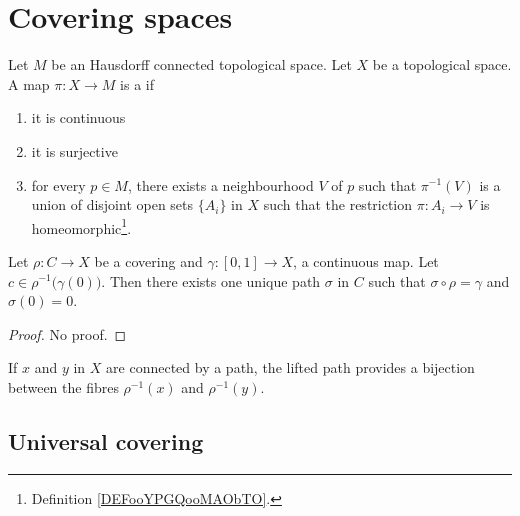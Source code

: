 \section{Covering spaces}

\begin{definition}      \label{DEFooQBDWooVVrkkh}
    Let \( M\) be an Hausdorff connected topological space. Let \( X\) be a topological space. A map \( \pi\colon X\to M\) is a  if
    \begin{enumerate}
        \item
            it is continuous
        \item
            it is surjective
        \item
            for every \( p\in M\), there exists a neighbourhood \( V\) of \( p\) such that \( \pi^{-1}(V)\) is a union of disjoint open sets \( \{ A_i \}\) in \( X\) such that the restriction \( \pi\colon A_i\to V\) is homeomorphic\footnote{Definition \ref{DEFooYPGQooMAObTO}.}.
    \end{enumerate}
\end{definition}

\begin{proposition}
Let $\rho\colon C\to X$ be a covering and $\gamma\colon [0,1]\to X$, a continuous map. Let $c\in \rho^{-1}\big( \gamma(0) \big)$. Then there exists one unique path $\sigma$ in $C$ such that $\sigma\circ\rho=\gamma$ and $\sigma(0)=0$.
\end{proposition}
\begin{proof}
No proof.
\end{proof}
If $x$ and $y$ in $X$ are connected by a path, the lifted path provides a bijection between the fibres $\rho^{-1}(x)$ and $\rho^{-1}(y)$.

\subsection{Universal covering}

